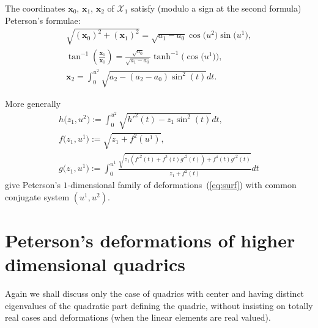 \documentclass[11pt]{article}
\begin{document}
The coordinates $\mathbf{x}_0$, $\mathbf{x}_1$, $\mathbf{x}_2$ of
$\mathcal{X}_1$ satisfy (modulo a sign at the second formula)
Peterson's formulae:
\begin{gather}
\sqrt{(\mathbf{x}_0)^2+(\mathbf{x}_1)^2}=\sqrt{a_1-a_0}\cos\big (u^2\big) \sin\big(u^1\big),\nonumber\\
\tan^{-1}\left(\frac{\mathbf{x}_1}{\mathbf{x}_0}\right)=
\frac{\sqrt{a_0}}{\sqrt{a_1-a_0}}\tanh^{-1}\big(\cos\big(u^1\big)\big),\nonumber\\
\mathbf{x}_2=\int_0^{u^2}\sqrt{a_2-(a_2-a_0)\sin^2(t)}dt.\label{eq:pf2}
\end{gather}

More generally
\begin{gather}
h\big(z_1,u^2\big):=\int_0^{u^2}\sqrt{h'^2(t)-z_1\sin^2(t)}dt,\nonumber\\
f\big(z_1,u^1\big):=\sqrt{z_1+f^2(u^1)},\nonumber\\
g\big(z_1,u^1\big):=\int_0^{u^1}\frac{\sqrt{z_1(f'^2(t)+f^2(t)g'^2(t))+f^4(t)g'^2(t)}}
{z_1+f^2(t)}dt\label{eq:bla}
\end{gather}
give Peterson's $1$-dimensional family of deformations~(\ref{eq:surf}) with common conjugate system $(u^1,u^2)$.


\section{Peterson's deformations of higher dimensional quadrics}\label{sec:pet1}

Again we shall discuss only the case of quadrics with center and
having distinct eigenvalues of the quadratic part def\/ining the
quadric, without insisting on totally real cases and deformations
(when the linear elements are real valued).
\end{document}
